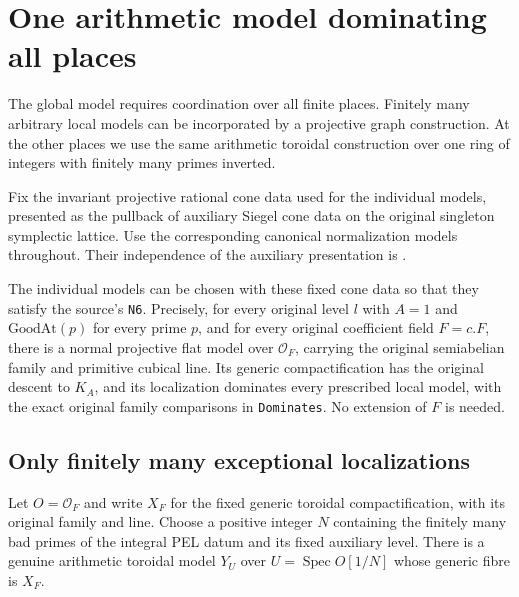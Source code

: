 \section{One arithmetic model dominating all places}
\label{sec:pel-global-model}

The global model requires coordination over all finite places.
Finitely many arbitrary local models can be incorporated by a
projective graph construction.  At the other places we use the
same arithmetic toroidal construction over one ring of integers
with finitely many primes inverted.

Fix the invariant projective rational cone data used for the
individual models, presented as the pullback of auxiliary Siegel
cone data on the original singleton symplectic lattice.
Use the corresponding canonical normalization models throughout.
Their independence of the auxiliary presentation is
\cite[Theorem 7.14]{global-model-lan-ramified}.

\begin{theorem}
\label{thm:pel-global-domination}
The individual models can be chosen with these fixed cone data so
that they satisfy the source's \texttt{N6}.  Precisely, for every
original level $l$ with $A=1$ and $\mathrm{GoodAt}(p)$ for every
prime $p$, and for every original coefficient field $F=c.F$, there
is a normal projective flat model over $\mathcal O_F$, carrying
the original semiabelian family and primitive cubical line.  Its
generic compactification has the original descent to $K_A$, and
its localization dominates every prescribed local model, with
the exact original family comparisons in \texttt{Dominates}.
No extension of $F$ is needed.
\end{theorem}

\subsection*{Only finitely many exceptional localizations}

Let $O=\mathcal O_F$ and write $X_F$ for the fixed generic
toroidal compactification, with its original family and line.
Choose a positive integer $N$ containing the finitely many bad
primes of the integral PEL datum and its fixed auxiliary level.
There is a genuine arithmetic toroidal model $Y_U$ over
$U=\operatorname{Spec}O[1/N]$ whose generic fibre is $X_F$.

